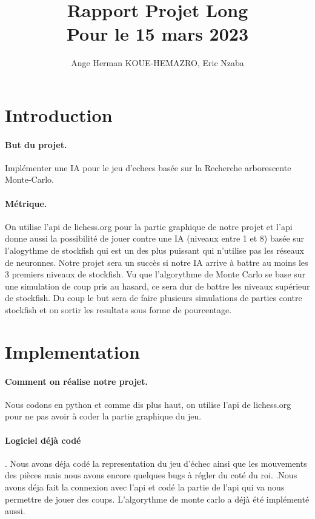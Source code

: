 \documentclass{article}
\title{Rapport Projet Long\\ Pour le 15 mars 2023}
\author{Ange Herman KOUE-HEMAZRO, Eric Nzaba}
\begin{document}
\maketitle


\section{Introduction}
\paragraph{But du projet.} Implémenter une IA pour le jeu d'echecs basée sur la Recherche 
arborescente Monte-Carlo.

\paragraph{Métrique.} On utilise l'api de lichess.org pour la partie graphique de notre projet et
l'api donne aussi la possibilité de jouer contre une IA (niveaux entre 1 et 8) basée sur l'alogythme de stockfish qui est
un des plus puissant qui n'utilise pas les réseaux de neuronnes. Notre projet sera un succès si notre
IA arrive à battre au moins les 3 premiers niveaux de stockfish. Vu que l'algorythme de Monte Carlo
se base sur une simulation de coup pris au hasard, ce sera dur de battre les niveaux supérieur
de stockfish. Du coup le but sera de faire plusieurs simulations de parties contre stockfish et on sortir
les resultats sous forme de pourcentage.

\section{Implementation}
\paragraph{Comment on réalise notre projet.} Nous codons en python et comme dis plus haut, on utilise
l'api de lichess.org pour ne pas avoir à coder la partie graphique du jeu. 

\paragraph{Logiciel déjà codé} . Nous avons déja codé la representation du jeu d'échec ainsi
que les mouvements des pièces mais nous avons encore quelques bugs à régler du coté du roi.
.Nous avons déja fait la connexion avec l'api et codé la partie de l'api qui va nous permettre de jouer
des coups. L'algorythme de monte carlo a déjà été implémenté aussi.
\end{document}
